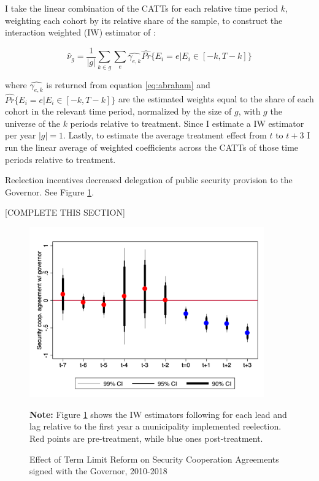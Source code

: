 \documentclass[12pt]{amsart}
\makeatletter
\def\section{\@startsection{section}{1}
	\z@{1.0\linespacing\@plus\linespacing}{.5\linespacing}{\Large}}
\numberwithin{equation}{section}
\theoremstyle{definition}
\theoremstyle{definition}
\theoremstyle{definition}
\makeatother
\begin{document}
I take the linear combination of the CATTs for each relative time period $k$, weighting each cohort by its relative share of the sample, to construct the interaction weighted (IW) estimator of \citet{abraham_sun_2020}:   

\begin{equation}
\hat{\nu}_g=\frac{1}{|g|}\sum_{k \in g}\sum_e \hat{\gamma_{e,k}} \hat{Pr}\{E_i=e | E_i \in [-k, T-k]\}	
\end{equation}

where $\hat{\gamma_{e,k}}$ is returned from equation \ref{eq:abraham} and $\hat{Pr}\{E_i=e | E_i \in [-k, T-k]\}$  are the estimated weights equal to the share of each cohort in the relevant time period, normalized by the size of  $g$, with $g$ the universe of the $k$ periods relative to treatment. Since I estimate a IW estimator per year $|g|=1$. Lastly, to estimate the average treatment effect from $t$ to $t+3$ I run the linear average of weighted coefficients across the CATTs of those time periods relative to treatment. 

\section{Main Results \label{sec:results}}

Reelection incentives decreased delegation of public security provision to the Governor. See Figure \ref{fig:event_study_agreements}.

[COMPLETE THIS SECTION]

\begin{figure}[h] 
\centering
 \caption{Effect of Term Limit Reform on Security Cooperation Agreements signed with the Governor, 2010-2018}
 \label{fig:event_study_agreements}
\includegraphics[width=0.9\textwidth]{../Figures/catts_agreements.png}
       \captionsetup{justification=centering}
       
 \textbf{Note:} Figure \ref{fig:event_study_agreements} shows the IW estimators following \citet{abraham_sun_2020} for each lead and lag relative to the first year a municipality implemented reelection. Red points are pre-treatment, while blue ones post-treatment. 
  
\end{figure}   
\end{document}
